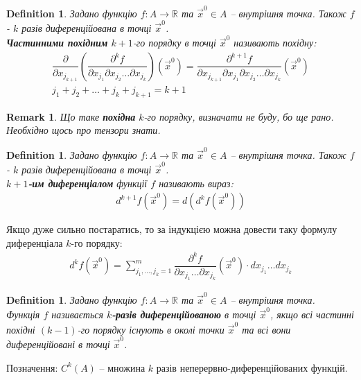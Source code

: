 \documentclass[a4paper, 10pt]{article}
\def\huge{\displaystyle}
\theoremstyle{theoremdd}
\theoremstyle{theoremdd}
\theoremstyle{theoremdd}
\newtheorem{definition}[theorem]{Definition}
\theoremstyle{theoremdd}
\theoremstyle{theoremdd}
\theoremstyle{theoremdd}
\theoremstyle{theoremdd}
\newtheorem{remark}[theorem]{Remark}
\theoremstyle{theoremdd}
\theoremstyle{theoremdd}
\begin{document}
\begin{definition}
Задано функцію $f\colon A \to \mathbb{R}$ та $\vec{x}^0 \in A$ -- внутрішня точка. Також $f$ - $k$ разів диференційована в точці $\vec{x}^0$.\\
\textbf{Частинними похідним} $k+1$-го порядку в точці $\vec{x}^0$ називають похідну:
\begin{align*}
\dfrac{\partial}{\partial x_{j_{k+1}}} \left( \dfrac{\partial^k f}{\partial x_{j_1} \partial x_{j_2} \dots \partial x_{j_k}} \right)(\vec{x}^0) = \dfrac{\partial^{k+1} f}{\partial x_{j_{k+1}} \partial x_{j_1} \partial x_{j_2} \dots \partial x_{j_k}}(\vec{x}^0) \\
j_1+j_2+\dots+j_k+j_{k+1} = k+1
\end{align*}
\end{definition}

\begin{remark}
Що таке \textbf{похідна} $k$-го порядку, визначати не буду, бо ще рано. Необхідно щось про тензори знати.
\end{remark}

\begin{definition}
Задано функцію $f\colon A \to \mathbb{R}$ та $\vec{x}^0 \in A$ -- внутрішня точка. Також $f$ - $k$ разів диференційована в точці $\vec{x}^0$.\\
\textbf{$k+1$-им диференціалом} функції $f$ називають вираз:
\begin{align*}
d^{k+1}f(\vec{x}^0) = d(d^k f(\vec{x}^0))
\end{align*}
\end{definition}
Якщо дуже сильно постаратись, то за індукцією можна довести таку формулу диференціала $k$-го порядку:
\begin{align*}
d^{k} f(\vec{x}^0) = \huge\sum_{j_1,\dots,j_k=1}^m \dfrac{\partial^k f}{\partial x_{j_1}\dots \partial x_{j_k}} (\vec{x}^0) \cdot dx_{j_1} \dots dx_{j_k}
\end{align*}

\begin{definition}
Задано функцію $f\colon A \to \mathbb{R}$ та $\vec{x}^0 \in A$ -- внутрішня точка.\\
Функція $f$ називається \textbf{$k$-разів диференційованою} в точці $\vec{x}^0$, якщо всі частинні похідні $(k-1)$-го порядку існують в околі точки $\vec{x}^0$ та всі вони диференційовані в точці $\vec{x}^0$.
\end{definition}

Позначення: $C^k(A)$ -- множина $k$ разів неперервно-диференційованих функцій.
\end{document}
